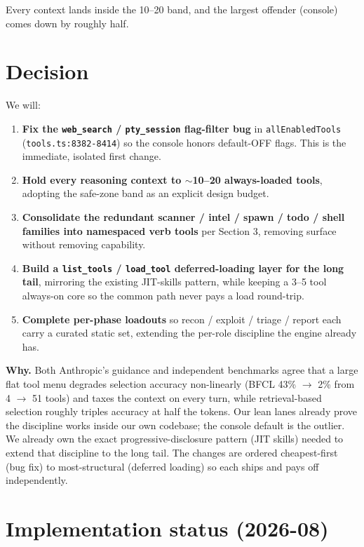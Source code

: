 \documentclass[11pt]{article}
\begin{document}
Every context lands inside the 10--20 band, and the largest offender (console)
comes down by roughly half.

\section{Decision}

We will:

\begin{enumerate}[leftmargin=*]
  \item \textbf{Fix the \texttt{web\_search} / \texttt{pty\_session} flag-filter
  bug} in \texttt{allEnabledTools} (\texttt{tools.ts:8382-8414}) so the console
  honors default-OFF flags. This is the immediate, isolated first change.
  \item \textbf{Hold every reasoning context to $\sim$10--20 always-loaded
  tools}, adopting the safe-zone band as an explicit design budget.
  \item \textbf{Consolidate the redundant scanner / intel / spawn / todo / shell
  families into namespaced verb tools} per Section 3, removing surface without
  removing capability.
  \item \textbf{Build a \texttt{list\_tools} / \texttt{load\_tool}
  deferred-loading layer for the long tail}, mirroring the existing JIT-skills
  pattern, while keeping a 3--5 tool always-on core so the common path never pays
  a load round-trip.
  \item \textbf{Complete per-phase loadouts} so recon / exploit / triage / report
  each carry a curated static set, extending the per-role discipline the engine
  already has.
\end{enumerate}

\textbf{Why.} Both Anthropic's guidance and independent benchmarks agree that a
large flat tool menu degrades selection accuracy non-linearly (BFCL 43\%
$\rightarrow$ 2\% from 4 $\rightarrow$ 51 tools) and taxes the context on every
turn, while retrieval-based selection roughly triples accuracy at half the tokens.
Our lean lanes already prove the discipline works inside our own codebase; the
console default is the outlier. We already own the exact progressive-disclosure
pattern (JIT skills) needed to extend that discipline to the long tail. The
changes are ordered cheapest-first (bug fix) to most-structural (deferred
loading) so each ships and pays off independently.

\section{Implementation status (2026-08)}
\end{document}
